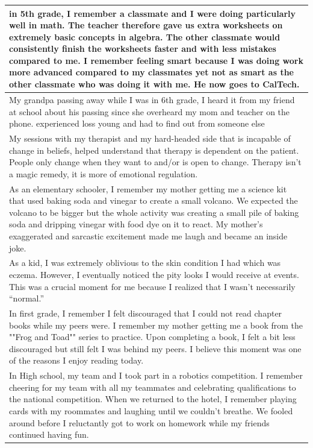 \documentclass[
  .7em,
  letterpaper,
  DIV=11,
  numbers=noendperiod]{scrartcl}
\begin{document}
\begin{table}
\begin{tabular}{l}
\hline
in 5th grade, I remember a classmate and I were doing particularly well in math. The teacher therefore gave us extra worksheets on extremely basic concepts in algebra. The other classmate would consistently finish the worksheets faster and with less mistakes compared to me. I remember feeling smart because I was doing work more advanced compared to my classmates yet not as smart as the other classmate who was doing it with me. He now goes to CalTech.\\
\hline
My grandpa passing away while I was in 6th grade, I heard it from my friend at school about his passing since she overheard my mom and teacher on the phone. experienced loss young and had to find out from someone else\\
\hline
My sessions with my therapist and my hard-headed side that is incapable of change in beliefs, helped understand that therapy is dependent on the patient. People only change when they want to and/or is open to change. Therapy isn't a magic remedy, it is more of emotional regulation.\\
\hline
As an elementary schooler, I remember my mother getting me a science kit that used baking soda and vinegar to create a small volcano. We expected the volcano to be bigger but the whole activity was creating a small pile of baking soda and dripping vinegar with food dye on it to react. My mother’s exaggerated and sarcastic excitement made me laugh and became an inside joke.\\
\hline
As a kid, I was extremely oblivious to the skin condition I had which was eczema. However, I eventually noticed the pity looks I would receive at events. This was a crucial moment for me because I realized that I wasn’t necessarily “normal.”\\
\hline
In first grade, I remember I felt discouraged that I could not read chapter books while my peers were. I remember my mother getting me a book from the ""Frog and Toad"" series to practice. Upon completing a book, I felt a bit less discouraged but still felt I was behind my peers. I believe this moment was one of the reasons I enjoy reading today.\\
\hline
In High school, my team and I took part in a robotics competition. I remember cheering for my team with all my teammates and celebrating qualifications to the national competition. When we returned to the hotel, I remember playing cards with my roommates and laughing until we couldn’t breathe. We fooled around before I reluctantly got to work on homework while my friends continued having fun.\\

\end{tabular}
\end{table}
\end{document}
